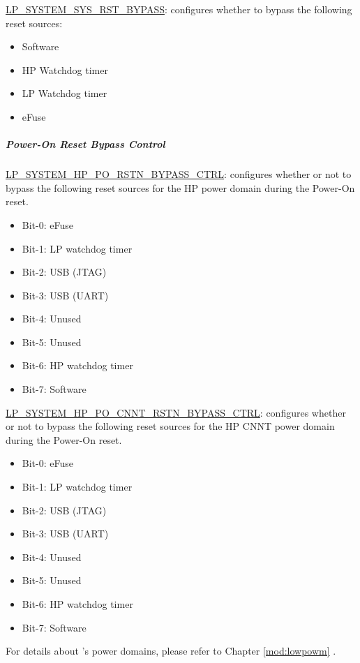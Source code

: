 \documentclass[main\_\_EN.tex]{subfiles}
\begin{document}
\hyperref[fielddesc:LPSYSTEMSYSRSTBYPASS]{LP\_SYSTEM\_SYS\_RST\_BYPASS}: configures whether to bypass the following reset sources:
\begin{itemize}
    \item Software
    \item HP Watchdog timer
    \item LP Watchdog timer
    \item eFuse
\end{itemize}

\subparagraph{Power-On Reset Bypass Control} \label{sec:power-on-by-pass}

\hyperref[fielddesc:LPSYSTEMHPPORSTNBYPASSCTRL]{LP\_SYSTEM\_HP\_PO\_RSTN\_BYPASS\_CTRL}: configures whether or not to bypass the following reset sources for the HP power domain during the Power-On reset.
\begin{itemize}
    \item Bit-0: eFuse
    \item Bit-1: LP watchdog timer
    \item Bit-2: USB (JTAG)
    \item Bit-3: USB (UART)
    \item Bit-4: Unused
    \item Bit-5: Unused
    \item Bit-6: HP watchdog timer
    \item Bit-7: Software
\end{itemize}

\hyperref[fielddesc:LPSYSTEMHPPOCNNTRSTNBYPASSCTRL]{LP\_SYSTEM\_HP\_PO\_CNNT\_RSTN\_BYPASS\_CTRL}: configures whether or not to bypass the following reset sources for the HP CNNT power domain during the Power-On reset.
\begin{itemize}
    \item Bit-0: eFuse
    \item Bit-1: LP watchdog timer
    \item Bit-2: USB (JTAG)
    \item Bit-3: USB (UART)
    \item Bit-4: Unused
    \item Bit-5: Unused
    \item Bit-6: HP watchdog timer
    \item Bit-7: Software
\end{itemize}

For details about \chipname{}'s power domains, please refer to Chapter \ref{mod:lowpowm} \textit{}.
\end{document}

